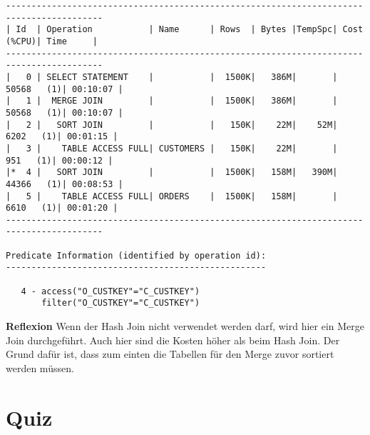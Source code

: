 \documentclass[10pt]{article}
\begin{document}
\begin{lstlisting}[style=queryexecutionplan]
-----------------------------------------------------------------------------------------
| Id  | Operation           | Name      | Rows  | Bytes |TempSpc| Cost (%CPU)| Time     |
-----------------------------------------------------------------------------------------
|   0 | SELECT STATEMENT    |           |  1500K|   386M|       | 50568   (1)| 00:10:07 |
|   1 |  MERGE JOIN         |           |  1500K|   386M|       | 50568   (1)| 00:10:07 |
|   2 |   SORT JOIN         |           |   150K|    22M|    52M|  6202   (1)| 00:01:15 |
|   3 |    TABLE ACCESS FULL| CUSTOMERS |   150K|    22M|       |   951   (1)| 00:00:12 |
|*  4 |   SORT JOIN         |           |  1500K|   158M|   390M| 44366   (1)| 00:08:53 |
|   5 |    TABLE ACCESS FULL| ORDERS    |  1500K|   158M|       |  6610   (1)| 00:01:20 |
-----------------------------------------------------------------------------------------
 
Predicate Information (identified by operation id):
---------------------------------------------------
 
   4 - access("O_CUSTKEY"="C_CUSTKEY")
       filter("O_CUSTKEY"="C_CUSTKEY")
\end{lstlisting}
\textbf{Reflexion} \newline
Wenn der Hash Join nicht verwendet werden darf, wird hier ein Merge Join durchgeführt.
Auch hier sind die Kosten höher als beim Hash Join.
Der Grund dafür ist, dass zum einten die Tabellen für den Merge zuvor sortiert werden müssen.

\section{Quiz}
\end{document}

